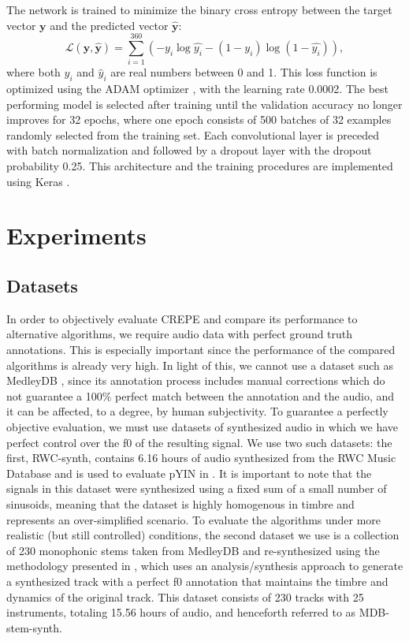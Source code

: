 The network is trained to minimize the binary cross entropy between the target vector $\mathbf{y}$ and the predicted vector $\hat{\mathbf{y}}$:
\begin{equation}
\mathcal{L}(\mathbf{y}, \hat{\mathbf{y}}) = \sum_{i=1}^{360} \left ( - y_i \log \hat{y_i} - (1 - y_i) \log (1 - \hat{y_i}) \right ),
\end{equation}
where both $y_i$ and $\hat{y}_i$ are real numbers between 0 and 1.
This loss function is optimized using the ADAM optimizer \cite{kingma2015adam}, with the learning rate 0.0002. 
The best performing model is selected after training until the validation accuracy no longer improves for 32 epochs, where one epoch consists of 500 batches of 32 examples randomly selected from the training set. 
Each convolutional layer is preceded with batch normalization \cite{ioffe2015batchnorm} and followed by a dropout layer \cite{srivastava2014dropout} with the dropout probability 0.25.
This architecture and the training procedures are implemented using Keras \cite{chollet2015keras}.




\section{Experiments}

\subsection{Datasets}

In order to objectively evaluate CREPE and compare its performance to alternative algorithms, we require audio data with perfect ground truth annotations.
This is especially important since the performance of the compared algorithms is already very high.
In light of this, we cannot use a dataset such as MedleyDB \cite{bittner2014medleydb}, since its annotation process includes manual corrections which do not guarantee a 100\% perfect match between the annotation and the audio, and it can be affected, to a degree, by human subjectivity.
To guarantee a perfectly objective evaluation, we must use datasets of synthesized audio in which we have perfect control over the f0 of the resulting signal.
We use two such datasets: the first, RWC-synth, contains 6.16 hours of audio synthesized from the RWC Music Database \cite{goto2002rwc} and is used to evaluate pYIN in \cite{mauch2014pyin}.
It is important to note that the signals in this dataset were synthesized using a fixed sum of a small number of sinusoids, meaning that the dataset is highly homogenous in timbre and represents an over-simplified scenario.
To evaluate the algorithms under more realistic (but still controlled) conditions, the second dataset we use is a collection of 230 monophonic stems taken from MedleyDB and re-synthesized using the methodology presented in \cite{salamon2017analysis}, which uses an analysis/synthesis approach to generate a synthesized track with a perfect f0 annotation that maintains the timbre and dynamics of the original track.
This dataset consists of 230 tracks with 25 instruments, totaling 15.56 hours of audio, and henceforth referred to as MDB-stem-synth.


